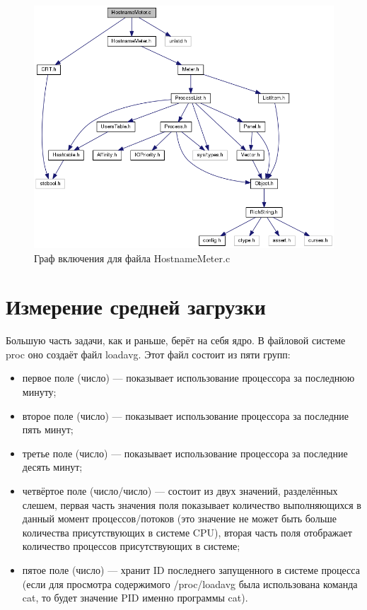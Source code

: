 \documentclass[a4paper, 12pt]{article}		%
\begin{document}
\begin{figure}[h!]
\centering
\includegraphics[scale=0.6]{res/hostname_meter.png}
\caption{Граф включения для файла HostnameMeter.c}
\end{figure}

\newpage
\section{Измерение средней загрузки}

Большую часть задачи, как и раньше, берёт на себя ядро. В файловой системе proc оно создаёт файл loadavg. Этот файл состоит из пяти групп\cite{HowTo}:
\begin{itemize}
\item первое поле (число) — показывает использование процессора за последнюю минуту;
\item второе поле (число) — показывает использование процессора за последние пять минут;
\item третье поле (число) — показывает использование процессора за последние десять минут;
\item четвёртое поле (число/число) — состоит из двух значений, разделённых слешем, первая часть значения поля показывает количество выполняющихся в данный момент процессов/потоков (это значение не может быть больше количества присутствующих в системе CPU), вторая часть поля отображает количество процессов присутствующих в системе;
\item пятое поле (число) — хранит ID последнего запущенного в системе процесса (если для просмотра содержимого /proc/loadavg была использована команда cat, то будет значение PID именно программы cat).
\end{itemize}
\end{document}
